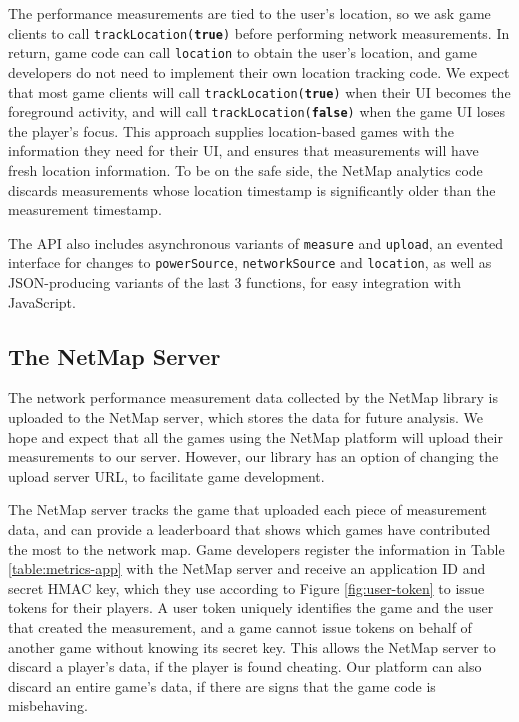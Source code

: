The performance measurements are tied to the user's location, so we ask game
clients to call \texttt{trackLocation(\textbf{true})} before performing network
measurements. In return, game code can call \texttt{location} to obtain the
user's location, and game developers do not need to implement their own
location tracking code. We expect that most game clients will call
\texttt{trackLocation(\textbf{true})} when their UI becomes the foreground
activity, and will call \texttt{trackLocation(\textbf{false})} when the game UI
loses the player's focus. This approach supplies location-based games with the
information they need for their UI, and ensures that measurements will have
fresh location information. To be on the safe side, the NetMap analytics code
discards measurements whose location timestamp is significantly older than the
measurement timestamp.

The API also includes asynchronous variants of \texttt{measure} and
\texttt{upload}, an evented interface for changes to \texttt{powerSource},
\texttt{networkSource} and \texttt{location}, as well as JSON-producing
variants of the last 3 functions, for easy integration with JavaScript.

\subsection{The NetMap Server}

The network performance measurement data collected by the NetMap library is
uploaded to the NetMap server, which stores the data for future analysis. We
hope and expect that all the games using the NetMap platform will upload their
measurements to our server. However, our library has an option of changing the
upload server URL, to facilitate game development.

The NetMap server tracks the game that uploaded each piece of measurement data,
and can provide a leaderboard that shows which games have contributed the most
to the network map. Game developers register the information in Table
\ref{table:metrics-app} with the NetMap server and receive an application ID
and secret HMAC key, which they use according to Figure \ref{fig:user-token}
to issue tokens for their players. A user token uniquely identifies the game
and the user that created the measurement, and a game cannot issue tokens on
behalf of another game without knowing its secret key. This allows the NetMap
server to discard a player's data, if the player is found cheating. Our
platform can also discard an entire game's data, if there are signs that the
game code is misbehaving.

